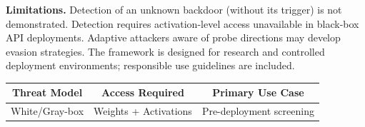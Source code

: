 \documentclass[11pt,letterpaper]{article}
\begin{document}
\begin{tcolorbox}
\textbf{Limitations.} Detection of an unknown backdoor (without its trigger) is not demonstrated. Detection requires activation-level access unavailable in black-box API deployments. Adaptive attackers aware of probe directions may develop evasion strategies. The framework is designed for research and controlled deployment environments; responsible use guidelines are included.
\end{tcolorbox}

\vspace{0.6cm}
\begin{center}
\begin{tabular}{ccc}
\toprule
\textbf{Threat Model} & \textbf{Access Required} & \textbf{Primary Use Case} \\
\midrule
White/Gray-box & Weights + Activations & Pre-deployment screening \\
\bottomrule
\end{tabular}
\end{center}

\newpage

\thispagestyle{empty}
\tableofcontents
\newpage
\end{document}
